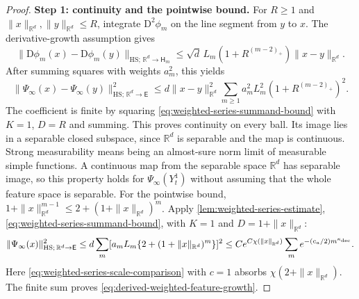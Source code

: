 \begin{proof}
\noindent\textbf{Step 1: continuity and the pointwise bound.}
For $R\ge1$ and $\|x\|_{\mathbb R^d},\|y\|_{\mathbb R^d}\le R$, integrate $\mathrm D^2\phi_m$ on the line
segment from $y$ to $x$. The derivative-growth assumption gives
\[
 \|\mathrm D\phi_m(x)-\mathrm D\phi_m(y)\|_{\mathrm{HS};\,\mathbb R^d\to\mathsf H_m}
 \le\sqrt d\,L_m(1+R^{(m-2)_+})\|x-y\|_{\mathbb R^d}.
\]
After summing squares with weights $a_m^2$, this yields
\[
 \|\Psi_\infty(x)-\Psi_\infty(y)\|_{\mathrm{HS};\,\mathbb R^d\to\mathsf E}^2
 \le d\|x-y\|_{\mathbb R^d}^2\sum_{m\ge1}a_m^2L_m^2(1+R^{(m-2)_+})^2.
\]
The coefficient is finite by squaring \eqref{eq:weighted-series-summand-bound}
with $K=1$, $D=R$ and summing. This proves continuity on every ball. Its image
lies in a separable closed subspace, since $\mathbb R^d$ is separable and
the map is continuous. Strong measurability means being an almost-sure norm limit of measurable
simple functions. A continuous map from the separable space $\mathbb R^d$
has separable image, so this property holds for $\Psi_\infty(Y_t^1)$
without assuming that the whole feature space is separable.
For the pointwise bound, $1+\|x\|_{\mathbb R^d}^{m-1}\le2+(1+\|x\|_{\mathbb R^d})^m$.
Apply \cref{lem:weighted-series-estimate},
\eqref{eq:weighted-series-summand-bound}, with $K=1$ and $D=1+\|x\|_{\mathbb R^d}$:
\begin{equation}
\label{eq:weighted-feature-growth-series}
 \|\Psi_\infty(x)\|_{\mathrm{HS};\,\mathbb R^d\to\mathsf E}^2
 \le d\sum_m[a_mL_m\{2+(1+\|x\|_{\mathbb R^d})^m\}]^2
 \le Ce^{C\chi(\|x\|_{\mathbb R^d})}\sum_m e^{-(c_a/2)m^{\kappa_{\rm dec}}}.
\end{equation}
Here \eqref{eq:weighted-series-scale-comparison} with $c=1$ absorbs
$\chi(2+\|x\|_{\mathbb R^d})$. The finite sum proves
\eqref{eq:derived-weighted-feature-growth}.


\end{proof}
